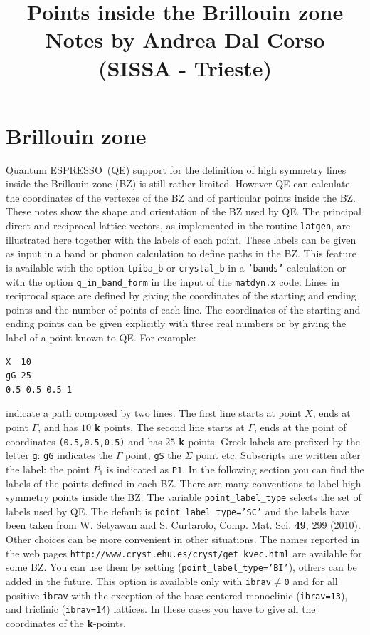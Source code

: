 \documentclass[12pt,a4paper]{article}
\def\qe{{\sc Quantum ESPRESSO}}
\begin{document}
 
\author{}
\date{}
\title{
  \vskip 1cm
  \Huge Points inside the Brillouin zone \\
  \Large Notes by Andrea Dal Corso (SISSA - Trieste)
}
\maketitle

\newpage

\section{Brillouin zone}

\qe\ (QE) support for the definition of high symmetry lines inside the Brillouin
zone (BZ) is still rather limited. However QE can calculate the coordinates 
of the vertexes of the BZ and of particular points inside the BZ. These 
notes show the shape and orientation of the BZ used by QE. The principal 
direct and reciprocal lattice vectors, as implemented 
in the routine \texttt{latgen}, are illustrated here together with the labels 
of each point. These labels can be given as input in a band or phonon 
calculation to define paths in the BZ. This feature is available with 
the option \texttt{tpiba\_b} or \texttt{crystal\_b} in a \texttt{'bands'} 
calculation or with the option \texttt{q\_in\_band\_form} in the input of the 
\texttt{matdyn.x} code.
Lines in reciprocal space are defined by giving the coordinates of the 
starting and ending points and the number of points of each line.
The coordinates of the starting and ending points can be 
given explicitly with three real numbers or by giving the label of a 
point known to QE.
For example:
\begin{verbatim}
X  10
gG 25
0.5 0.5 0.5 1
\end{verbatim}
indicate a path composed by two lines. The first line starts at point $X$,
ends at point $\Gamma$, and has $10$ {\bf k} points. The second line starts
at $\Gamma$, ends at the point of coordinates \texttt{(0.5,0.5,0.5)} and
has $25$ {\bf k} points. Greek labels are prefixed by the letter
\texttt{g}: \texttt{gG} indicates the $\Gamma$ point, \texttt{gS} the 
$\Sigma$ point etc. Subscripts are written after the label: the point $P_1$ 
is indicated as \texttt{P1}. In the following section you can find the
labels of the points defined in each BZ. 
There are many conventions to label high symmetry
points inside the BZ. The variable \texttt{point\_label\_type} selects the
set of labels used by QE. The default is \texttt{point\_label\_type='SC'} and
the labels have been taken from W. Setyawan and S. Curtarolo, Comp. Mat. Sci.
{\bf 49}, 299 (2010). Other choices can be more convenient in other situations. 
The names reported in the web pages 
\texttt{http://www.cryst.ehu.es/cryst/get\_kvec.html}
are available for some BZ. You can use them by setting
(\texttt{point\_label\_type='BI'}), others can be added in the future.
This option is available only with \texttt{ibrav$\ne$0} and for 
all positive \texttt{ibrav} with the exception of the base centered 
monoclinic (\texttt{ibrav=13}), and triclinic (\texttt{ibrav=14}) lattices. 
In these cases you have to give all the coordinates of the {\bf k}-points.
\end{document}
